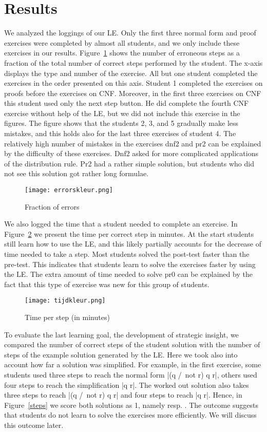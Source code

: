 \documentclass[a4paper,UKenglish]{lipics}
\begin{document}
\section{Results}
We analyzed the loggings of our LE. Only the first three normal form and proof
exercises were completed by almost all students, and we only include these
exercises in our results. Figure~\ref{errors} shows the number of erroneous
steps as a fraction of the total number of correct steps performed by the student. The x-axis displays the type and number of the exercise. All but one student completed the exercises in the order presented on this axis. Student 1 completed the exercises on proofs before
the exercises on CNF. Moreover, in the first three exercises on CNF this student
used only the next step button. He did complete the fourth CNF exercise
without help of the LE, but we did not include this
exercise in the figures. The figure shows that the students 2, 3, and 5 gradually 
make less mistakes, and this holds also for the last three exercises of student 4. 
The relatively high number of mistakes in the exercises dnf2 and pr2 can be explained by the 
difficulty of these exercises. Dnf2 asked for more complicated applications of the 
distribution rule. Pr2 had a rather simple solution, but students who did not see this solution got rather long formulae.

\begin{figure}[p]
\center\texttt{[image: errorskleur.png]}
\caption{Fraction of errors}
\label{errors}
\end{figure}

We also logged the time that a student needed to complete an exercise. In
Figure~\ref{tijd} we present the time per correct step in minutes. 
At the start students still learn how to use the LE, and this
likely partially accounts for the decrease of time needed to take a step. Most
students solved the post-test faster than the pre-test. This indicates that
students learn to solve the exercises faster by using the LE. 
The extra amount of time needed to solve pr0 can be explained by the fact that 
this type of exercise was new for this group of students.


\begin{figure}[p]
\center\texttt{[image: tijdkleur.png]}
\caption{Time per step (in minutes)}
\label{tijd}
\end{figure}

To evaluate the last learning goal, the development of strategic insight, we
compared the number of correct steps of the student solution with the number of
steps of the example solution generated by the LE. Here we took also into account how far
a solution was simplified. For example, in the first exercise, some students used
three steps to reach the normal form |(q /\ not r) \/ q \/ r|, others used 
four steps to reach the simplification |q \/ r|. The worked out solution also takes three steps to reach |(q /\ not r) \/ q \/ r| and four steps to reach |q \/ r|. Hence, in Figure~\ref{steps} we score 
both solutions as 1, namely  resp. . 
The outcome suggests that students do not learn to
solve the exercises more efficiently. We will discuss this outcome later. 
\end{document}
